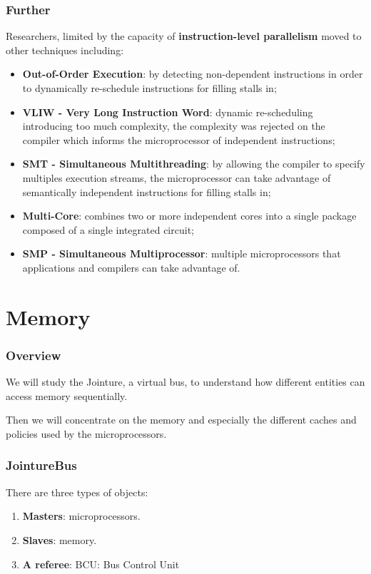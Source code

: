 \begin{frame}
  \frametitle{Further}

  Researchers, limited by the capacity of \textbf{instruction-level
  parallelism} moved to other techniques including:

  \begin{itemize}
    \item
      \textbf{Out-of-Order Execution}: by detecting non-dependent instructions
      in order to dynamically re-schedule instructions for filling stalls in;
    \item
      \textbf{VLIW - Very Long Instruction Word}: dynamic re-scheduling
      introducing too much complexity, the complexity was rejected on the
      compiler which informs the microprocessor of independent instructions;
    \item
      \textbf{SMT - Simultaneous Multithreading}: by allowing the compiler
      to specify multiples execution streams, the microprocessor can take
      advantage of semantically independent instructions for filling stalls in;
    \item
      \textbf{Multi-Core}: combines two or more independent cores into a
      single package composed of a single integrated circuit;
    \item  
      \textbf{SMP - Simultaneous Multiprocessor}: multiple microprocessors
      that applications and compilers can take advantage of.
  \end{itemize}
\end{frame}

%
%

\section{Memory}


\begin{frame}
  \frametitle{Overview}

  We will study the Jointure, a virtual bus, to understand how different
  entities can access memory sequentially.

  \-

  Then we will concentrate on the memory and especially the different
  caches and policies used by the microprocessors.
\end{frame}


\begin{frame}
  \frametitle{JointureBus}

  There are three types of objects:

  \begin{center}
  \end{center}

  \begin{enumerate}
    \item
      \textbf{Masters}: microprocessors.
    \item
      \textbf{Slaves}: memory.
    \item
      \textbf{A referee}: BCU: Bus Control Unit
  \end{enumerate}
\end{frame}

